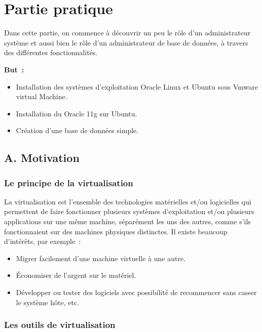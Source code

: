 \documentclass[12pt,a4paper]{report}
\begin{document}
\chapter{Partie pratique}

Dans cette partie, on commence à découvrir un peu le rôle d'un administrateur
système et aussi bien le rôle d'un administrateur de base de données, à travers des
différentes fonctionnalités.

\medskip
\noindent\textbf{But~:}
\begin{itemize}[leftmargin=*]
  \item Installation des systèmes d'exploitation Oracle Linux et Ubuntu sous Vmware
        virtual Machine.
  \item Installation du Oracle 11g sur Ubuntu.
  \item Création d'une base de données simple.
\end{itemize}

\section*{A. Motivation}

\subsection{Le principe de la virtualisation}

La virtualisation est l'ensemble des technologies matérielles et/ou logicielles qui
permettent de faire fonctionner plusieurs systèmes d'exploitation et/ou plusieurs
applications sur une même machine, séparément les uns des autres, comme s'ils
fonctionnaient sur des machines physiques distinctes. Il existe beaucoup
d'intérêts, par exemple~:

\begin{itemize}[leftmargin=*]
  \item Migrer facilement d'une machine virtuelle à une autre.
  \item Économiser de l'argent sur le matériel.
  \item Développer ou tester des logiciels avec possibilité de recommencer sans
        casser le système hôte, etc.
\end{itemize}

\subsection{Les outils de virtualisation}
\end{document}

